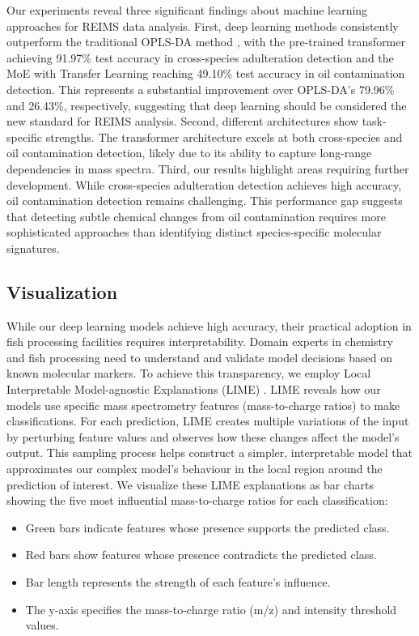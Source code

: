 Our experiments reveal three significant findings about machine learning approaches for REIMS data analysis. First, deep learning methods consistently outperform the traditional OPLS-DA method \citep{Verplanken2016,Black2017,Black2019}, with the pre-trained transformer achieving 91.97\% test accuracy in cross-species adulteration detection and the MoE with Transfer Learning reaching 49.10\% test accuracy in oil contamination detection. This represents a substantial improvement over OPLS-DA's 79.96\% and 26.43\%, respectively, suggesting that deep learning should be considered the new standard for REIMS analysis.
Second, different architectures show task-specific strengths. The transformer architecture excels at both cross-species and oil contamination detection, likely due to its ability to capture long-range dependencies in mass spectra.
Third, our results highlight areas requiring further development. While cross-species adulteration detection achieves high accuracy, oil contamination detection remains challenging. This performance gap suggests that detecting subtle chemical changes from oil contamination requires more sophisticated approaches than identifying distinct species-specific molecular signatures.

\subsection{Visualization} 

While our deep learning models achieve high accuracy, their practical adoption in fish processing facilities requires interpretability. Domain experts in chemistry and fish processing need to understand and validate model decisions based on known molecular markers. To achieve this transparency, we employ Local Interpretable Model-agnostic Explanations (LIME) \citep{Ribeiro2016}.
LIME reveals how our models use specific mass spectrometry features (mass-to-charge ratios) to make classifications. For each prediction, LIME creates multiple variations of the input by perturbing feature values and observes how these changes affect the model's output. This sampling process helps construct a simpler, interpretable model that approximates our complex model's behaviour in the local region around the prediction of interest.
We visualize these LIME explanations as bar charts showing the five most influential mass-to-charge ratios for each classification:

\begin{itemize}
    \item Green bars indicate features whose presence supports the predicted class.
    \item Red bars show features whose presence contradicts the predicted class.
    \item Bar length represents the strength of each feature's influence.
    \item The y-axis specifies the mass-to-charge ratio (m/z) and intensity threshold values.
\end{itemize}

